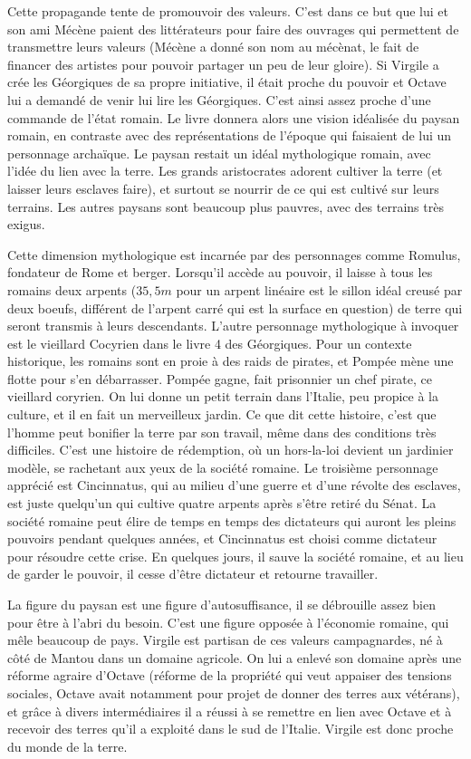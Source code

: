 \documentclass[a4paper,12pt]{book}
\begin{document}
\par Cette propagande tente de promouvoir des valeurs. C'est dans ce but que lui et son ami Mécène paient des littérateurs pour faire des ouvrages qui permettent de transmettre leurs valeurs (Mécène a donné son nom au mécènat, le fait de financer des artistes pour pouvoir partager un peu de leur gloire). Si Virgile a crée les Géorgiques de sa propre initiative, il était proche du pouvoir et Octave lui a demandé de venir lui lire les Géorgiques. C'est ainsi assez proche d'une commande de l'état romain. Le livre donnera alors une vision idéalisée du paysan romain, en contraste avec des représentations de l'époque qui faisaient de lui un personnage archaïque. Le paysan restait un idéal mythologique romain, avec l'idée du lien avec la terre. Les grands aristocrates adorent cultiver la terre (et laisser leurs esclaves faire), et surtout se nourrir de ce qui est cultivé sur leurs terrains. Les autres paysans sont beaucoup plus pauvres, avec des terrains très exigus.
\par Cette dimension mythologique est incarnée par des personnages comme Romulus, fondateur de Rome et berger. Lorsqu'il accède au pouvoir, il laisse à tous les romains deux arpents ($35,5m$ pour un arpent linéaire est le sillon idéal creusé par deux boeufs, différent de l'arpent carré qui est la surface en question) de terre qui seront transmis à leurs descendants. L'autre personnage mythologique à invoquer est le vieillard Cocyrien dans le livre 4 des Géorgiques. Pour un contexte historique, les romains sont en proie à des raids de pirates, et Pompée mène une flotte pour s'en débarrasser. Pompée gagne, fait prisonnier un chef pirate, ce vieillard coryrien. On lui donne un petit terrain dans l'Italie, peu propice à la culture, et il en fait un merveilleux jardin. Ce que dit cette histoire, c'est que l'homme peut bonifier la terre par son travail, même dans des conditions très difficiles. C'est une histoire de rédemption, où un hors-la-loi devient un jardinier modèle, se rachetant aux yeux de la société romaine. Le troisième personnage apprécié est Cincinnatus, qui au milieu d'une guerre et d'une révolte des esclaves, est juste quelqu'un qui cultive quatre arpents après s'être retiré du Sénat. La société romaine peut élire de temps en temps des dictateurs qui auront les pleins pouvoirs pendant quelques années, et Cincinnatus est choisi comme dictateur pour résoudre cette crise. En quelques jours, il sauve la société romaine, et au lieu de garder le pouvoir, il cesse d'être dictateur et retourne travailler.
\par La figure du paysan est une figure d'autosuffisance, il se débrouille assez bien pour être à l'abri du besoin. C'est une figure opposée à l'économie romaine, qui mêle beaucoup de pays. Virgile est partisan de ces valeurs campagnardes, né à côté de Mantou dans un domaine agricole. On lui a enlevé son domaine après une réforme agraire d'Octave (réforme de la propriété qui veut appaiser des tensions sociales, Octave avait notamment pour projet de donner des terres aux vétérans), et grâce à divers intermédiaires il a réussi à se remettre en lien avec Octave et à recevoir des terres qu'il a exploité dans le sud de l'Italie. Virgile est donc proche du monde de la terre.
\end{document}
